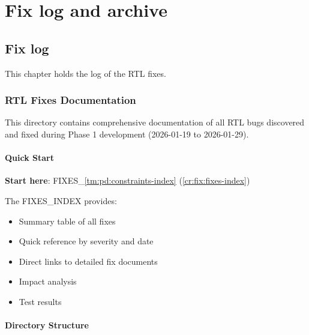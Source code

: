 \part{Fix log and archive}\label{cr:part:fix-log-and-archive}

\chapter{Fix log}\label{cr:ch:fix-log}

This chapter holds the log of the RTL fixes.

\section{RTL Fixes Documentation}\label{cr:fix:fixes-readme}

\begin{record}

This directory contains comprehensive documentation of all RTL bugs
discovered and fixed during Phase 1 development (2026-01-19 to
2026-01-29).

\end{record}

\subsection{Quick Start}\label{cr:fix:fixes-readme:quick-start}

\begin{record}

\textbf{\notemark{} Start here}:
FIXES\_\allowbreak{}\cref{tm:pd:constraints-index} (\cref{cr:fix:fixes-index})

The FIXES\_\allowbreak{}INDEX provides:

\begin{itemize}
\tightlist
\item
  Summary table of all fixes
\item
  Quick reference by severity and date
\item
  Direct links to detailed fix documents
\item
  Impact analysis
\item
  Test results
\end{itemize}

\end{record}

\subsection{Directory Structure}\label{cr:fix:fixes-readme:directory-structure}

